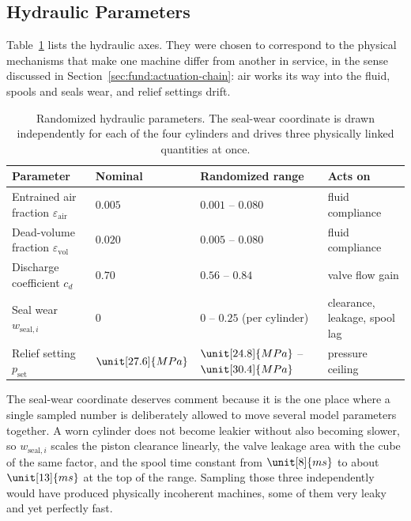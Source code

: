 \subsection{Hydraulic Parameters}

Table~\ref{tab:data:hydraulic} lists the hydraulic axes. They were
chosen to correspond to the physical mechanisms that make one machine
differ from another in service, in the sense discussed in
Section~\ref{sec:fund:actuation-chain}: air works its way into the
fluid, spools and seals wear, and relief settings drift.

\begin{table}[tb]
  \centering
  \caption{Randomized hydraulic parameters. The seal-wear coordinate is
  drawn independently for each of the four cylinders and drives three
  physically linked quantities at once.}
  \label{tab:data:hydraulic}
  \small
  \begin{tabular}{llll}
    \toprule
    Parameter & Nominal & Randomized range & Acts on \\
    \midrule
    Entrained air fraction $\varepsilon_{\mathrm{air}}$
      & $0.005$ & $0.001$ -- $0.080$ & fluid compliance \\
    Dead-volume fraction $\varepsilon_{\mathrm{vol}}$
      & $0.020$ & $0.005$ -- $0.080$ & fluid compliance \\
    Discharge coefficient $c_d$
      & $0.70$ & $0.56$ -- $0.84$ & valve flow gain \\
    Seal wear $w_{\mathrm{seal},i}$
      & $0$ & $0$ -- $0.25$ (per cylinder)
      & clearance, leakage, spool lag \\
    Relief setting $p_{\mathrm{set}}$
      & $\unit[27.6]{MPa}$ & $\unit[24.8]{MPa}$ -- $\unit[30.4]{MPa}$
      & pressure ceiling \\
    \bottomrule
  \end{tabular}
\end{table}

The seal-wear coordinate deserves comment because it is the one place
where a single sampled number is deliberately allowed to move several
model parameters together. A worn cylinder does not become leakier
without also becoming slower, so $w_{\mathrm{seal},i}$ scales the piston
clearance linearly, the valve leakage area with the cube of the same
factor, and the spool time constant from $\unit[8]{ms}$ to about
$\unit[13]{ms}$ at the top of the range. Sampling those three
independently would have produced physically incoherent machines, some
of them very leaky and yet perfectly fast.

